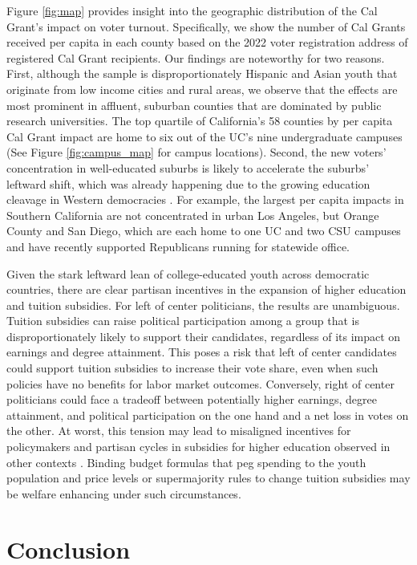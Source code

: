 \documentclass[12pt,letterpaper,oneside]{book}
\begin{document}
Figure \ref{fig:map} provides insight into the geographic distribution of the Cal Grant's impact on voter turnout. Specifically, we show the number of Cal Grants received per capita in each county based on the 2022 voter registration address of registered Cal Grant recipients. Our findings are noteworthy for two reasons. First, although the sample is disproportionately Hispanic and Asian youth that originate from low income cities and rural areas, we observe that the effects are most prominent in affluent, suburban counties that are dominated by public research universities. The top quartile of California's 58 counties by per capita Cal Grant impact are home to six out of the UC's nine undergraduate campuses (See Figure \ref{fig:campus_map} for campus locations). Second, the new voters' concentration in well-educated suburbs is likely to accelerate the suburbs' leftward shift, which was already happening due to the growing education cleavage in Western democracies \citep{gethin_brahmin_2021}. For example, the largest per capita impacts in Southern California are not concentrated in urban Los Angeles, but Orange County and San Diego, which are each home to one UC and two CSU campuses and have recently supported Republicans running for statewide office.


Given the stark leftward lean of college-educated youth across democratic countries, there are clear partisan incentives in the expansion of higher education and tuition subsidies. For left of center politicians, the results are unambiguous. Tuition subsidies can raise political participation among a group that is disproportionately likely to support their candidates, regardless of its impact on earnings and degree attainment. This poses a risk that left of center candidates could support tuition subsidies to increase their vote share, even when such policies have no benefits for labor market outcomes. Conversely, right of center politicians could face a tradeoff between potentially higher earnings, degree attainment, and political participation on the one hand and a net loss in votes on the other. At worst, this tension may lead to misaligned incentives for policymakers and partisan cycles in subsidies for higher education observed in other contexts \citep{ortega_state_2020}. Binding budget formulas that peg spending to the youth population and price levels or supermajority rules to change tuition subsidies may be welfare enhancing under such circumstances.


\section{Conclusion} \label{sec:conclusion}
\end{document}

